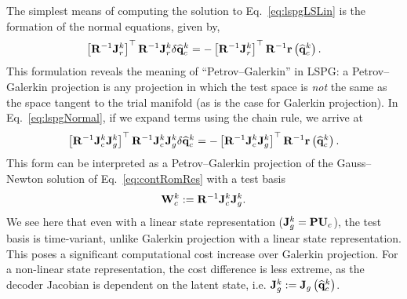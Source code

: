 The simplest means of computing the solution to Eq.~\ref{eq:lspgLSLin} is the formation of the normal equations, given by,
%
\begin{equation}\label{eq:lspgNormal}
    \left[\resScaleInv \jacobRes^{\newtonIdx}\right]^\top \resScaleInv \jacobRes^{\newtonIdx} \delta \consVecCoef^{\newtonIdx} = -\left[\resScaleInv \jacobRes^{\newtonIdx}\right]^\top \resScaleInv \resFunc{\consVecCoef^{\newtonIdx}}.
\end{equation}
%
This formulation reveals the meaning of ``Petrov--Galerkin'' in LSPG: a Petrov--Galerkin projection is any projection in which the test space is \textit{not} the same as the space tangent to the trial manifold (as is the case for Galerkin projection). In Eq.~\ref{eq:lspgNormal}, if we expand terms using the chain rule, we arrive at
%
\begin{equation}
    \left[\resScaleInv \jacobCons^{\newtonIdx} \jacobDecode^{\newtonIdx}\right]^\top \resScaleInv \jacobCons^{\newtonIdx} \jacobDecode^{\newtonIdx} \delta \consVecCoef^{\newtonIdx} = -\left[\resScaleInv \jacobCons^{\newtonIdx} \jacobDecode^{\newtonIdx}\right]^\top \resScaleInv \resFunc{\consVecCoef^{\newtonIdx}}.
\end{equation}
%
This form can be interpreted as a Petrov--Galerkin projection of the Gauss--Newton solution of Eq.~\ref{eq:contRomRes} with a test basis
%
\begin{equation}
    \testBasisCons^\newtonIdx \defEq \resScaleInv \jacobCons^\newtonIdx \jacobDecode^{\newtonIdx}.
\end{equation}
%
We see here that even with a linear state representation ($\jacobDecode^{\newtonIdx} = \consScale \consTrial$), the test basis is time-variant, unlike Galerkin projection with a linear state representation. This poses a significant computational cost increase over Galerkin projection. For a non-linear state representation, the cost difference is less extreme, as the decoder Jacobian is dependent on the latent state, i.e. $\mathbf{J}_{g}^{k} := \mathbf{J}_{g} \left(\mathbf{\widehat{q}}_{c}^{k}\right)$.

